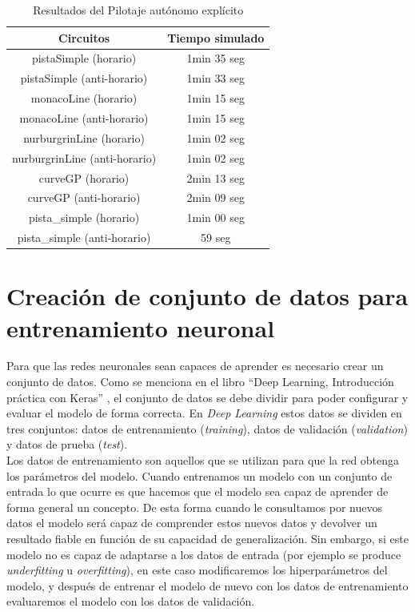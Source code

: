 \begin{table}[]
\centering
\caption{Resultados del Pilotaje autónomo explícito}
\label{tabla_piloto}
\begin{tabular}{| c| c |}
\hline
Circuitos & Tiempo simulado \\
\hline \hline
pistaSimple (horario) & 1min 35 seg \\ \hline
pistaSimple (anti-horario) & 1min 33 seg \\ \hline
monacoLine (horario) & 1min 15 seg \\ \hline
monacoLine (anti-horario) & 1min 15 seg \\ \hline
nurburgrinLine (horario) & 1min 02 seg \\ \hline
nurburgrinLine (anti-horario) & 1min 02 seg \\ \hline
curveGP (horario) & 2min 13 seg \\ \hline
curveGP (anti-horario) & 2min 09 seg \\ \hline
pista\_simple (horario) & 1min 00 seg \\ \hline
pista\_simple (anti-horario) & 59 seg \\ \hline
\end{tabular}
\end{table}


\section{Creación de conjunto de datos para entrenamiento neuronal}\label{dataset}

Para que las redes neuronales sean capaces de aprender es necesario crear un conjunto de datos. Como se menciona en el libro ``Deep Learning, Introducción práctica con Keras'' \cite{Jordi_torres}, el conjunto de datos se debe dividir para poder configurar y evaluar el modelo de forma correcta. En \textit{Deep Learning} estos datos se dividen en tres conjuntos: datos de entrenamiento (\textit{training}), datos de validación (\textit{validation}) y datos de prueba (\textit{test}).\\

Los datos de entrenamiento son aquellos que se utilizan para que la red obtenga los parámetros del modelo. Cuando entrenamos un modelo con un conjunto de entrada lo que ocurre es que hacemos que el modelo sea capaz de aprender de forma general un concepto. De esta forma cuando le consultamos por nuevos datos el modelo será capaz de comprender estos nuevos datos y devolver un resultado fiable en función de su capacidad de generalización. Sin embargo, si este modelo no es capaz de adaptarse a los datos de entrada (por ejemplo se produce \textit{underfitting} u \textit{overfitting}), en este caso modificaremos los hiperparámetros del modelo, y después de entrenar el modelo de nuevo con los datos de entrenamiento evaluaremos el modelo con los datos de validación.\\


